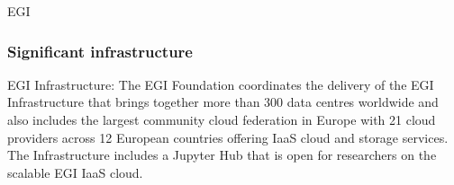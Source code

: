\begin{sitedescription}{EGI}
\subsubsection*{Significant infrastructure}

EGI Infrastructure: The EGI Foundation coordinates the delivery of the EGI Infrastructure that brings together more than 300 data centres worldwide and also includes the largest community cloud federation in Europe with 21 cloud providers across 12 European countries offering IaaS cloud and storage services. The Infrastructure includes a Jupyter Hub that is open for researchers on the scalable EGI IaaS cloud.

\end{sitedescription}
